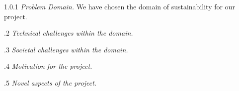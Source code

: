 1.0.1 \textit{Problem Domain.} We have chosen the domain of sustainability for our project.

.2 \textit{Technical challenges within the domain.} 

.3 \textit{Societal challenges within the domain.}

.4 \textit{Motivation for the project.}

.5 \textit{Novel aspects of the project.}